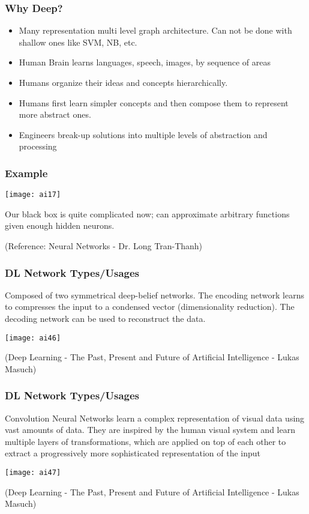 \begin{frame}[fragile] \frametitle{Why Deep?}

\begin{itemize}
\item Many representation multi level graph architecture. Can not be done with shallow ones like SVM, NB, etc.
\item Human Brain learns languages, speech, images, by sequence of areas
\item Humans organize their ideas and concepts hierarchically.
\item Humans first learn simpler concepts and then compose them to represent more abstract ones.
\item Engineers break-up solutions into multiple levels of abstraction and processing 
\end{itemize}
\end{frame}

\begin{frame}[fragile] \frametitle{Example}


\begin{center}
\texttt{[image: ai17]}
\end{center}

Our black box is quite complicated now; can approximate arbitrary functions given enough hidden neurons. 

\tiny{(Reference: Neural Networks - Dr. Long Tran-Thanh)}

\end{frame}

\begin{frame}[fragile] \frametitle{DL Network Types/Usages}
Composed of two symmetrical deep-belief networks. The encoding network learns to compresses the input to a condensed vector (dimensionality reduction). The decoding network can be used to reconstruct the data.

\begin{center}
\texttt{[image: ai46]}
\end{center}
{\tiny (Deep Learning - The Past, Present and Future of Artificial Intelligence - Lukas Masuch)}
\end{frame}

\begin{frame}[fragile] \frametitle{DL Network Types/Usages}
Convolution Neural Networks learn a complex representation of visual data
using vast amounts of data. They are inspired by the human visual system and
learn multiple layers of transformations, which are applied on top of each other to
extract a progressively more sophisticated representation of the input
\begin{center}
\texttt{[image: ai47]}
\end{center}
{\tiny (Deep Learning - The Past, Present and Future of Artificial Intelligence - Lukas Masuch)}
\end{frame}

